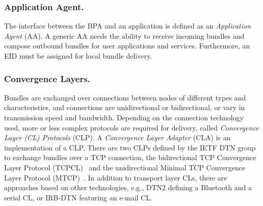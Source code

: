 \subsubsection{Application Agent.}
The interface between the BPA and an application is defined as an \textit{Application Agent} (AA).
A generic AA needs the ability to receive incoming bundles and compose outbound bundles for user applications and services.
Furthermore, an EID must be assigned for local bundle delivery.

\subsubsection{Convergence Layers.}
Bundles are exchanged over connections between nodes of different types and characteristics, and connections are unidirectional or bidirectional, or vary in transmission speed and bandwidth.
Depending on the connection technology used, more or less complex protocols are required for delivery, called \textit{Convergence Layer (CL) Protocols} (CLP).
A \textit{Convergence Layer Adapter} (CLA) is an implementation of a CLP.
There are two CLPs defined by the IETF DTN group to exchange bundles over a TCP connection, the bidirectional TCP Convergence Layer Protocol (TCPCL)~\cite{dtn_tcp} and the unidirectional Minimal TCP Convergence Layer Protocol (MTCP)~\cite{dtn_mtcp}.
In addition to transport layer CLs, there are approaches based on other technologies, e.g., DTN2 defining a Bluetooth and a serial CL, or IRB-DTN featuring an e-mail CL.
